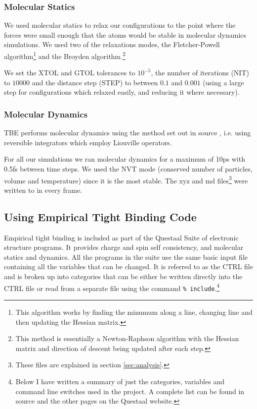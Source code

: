 \documentclass{article}
\begin{document}
\begin{multicols}{2}
\subsubsection{Molecular Statics}
\label{sec:relax}
We used molecular statics to relax our configurations to the point where the forces were small enough that the atoms would be stable in molecular dynamics simulations. We used two of the relaxations modes, the Fletcher-Powell algorithm\footnote{This algorithm works by finding the minumum along a line, changing line and then updating the Hessian matrix.}\cite{Fletcher1980,Davidson1959,CTRL} and the Broyden algorithm.\footnote{This method is essentially a Newton-Raphson algorithm with the Hessian matrix and direction of descent being updated after each step.}\cite{Broyden1965}

We set the XTOL and GTOL tolerances \cite{CTRL} to $10^{-5}$, the number of iterations (NIT) to $10000$ and the distance step (STEP) to between $0.1$ and $0.001$ (using a large step for configurations which relaxed easily, and reducing it where necessary).

\subsubsection{Molecular Dynamics}
\label{sec:MD}
TBE performs molecular dynamics using the method set out in source \cite{martyna1996explicit}, i.e. using reversible integrators which employ Liouville operators.

For all our simulations we ran molecular dynamics for a maximum of 10ps with 0.5fs between time steps. We used the NVT mode (conserved number of particles, volume and temperature) since it is the most stable. The xyz and md files\footnote{These files are explained in section \ref{sec:analysis}.} were written to in every frame.

\subsection{Using Empirical Tight Binding Code}
\label{sec:TBE}
Empirical tight binding is included as part of the Questaal Suite of electronic structure programs. It provides charge and spin self consistency, and molecular statics and dynamics. All the programs in the suite use the same basic input file containing all the variables that can be changed. It is referred to as the CTRL file \cite{CTRL} and is broken up into categories \cite{TBE} that can be either be written directly into the CTRL file or read from a separate file using the command \texttt{\% include}.\footnote{Below I have written a summary of just the categories, variables and command line switches used in the project. A complete list can be found in source \cite{CTRL} and the other pages on the Questaal website.}


\end{multicols}
\end{document}
